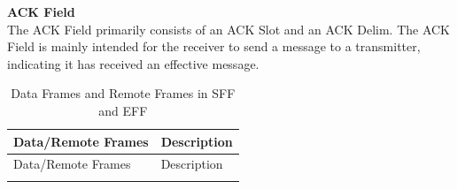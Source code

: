 \documentclass[main\_\_EN.tex]{subfiles}
\begin{document}
{\bfseries ACK Field}\\
The ACK Field primarily consists of an ACK Slot and an ACK Delim. The ACK Field is mainly intended for the receiver to send a message to a transmitter, indicating it has received an effective message.

\begin{longtable}[c]{|p{3.5cm}|p{12cm}|}

  \caption{Data Frames and Remote Frames in SFF and EFF}
  \label{table:Data Frames and Remote Frames}
  \\\hline
  \rowcolor{lightgray}
  {Data/Remote Frames} & {Description}
  \\\hline
  \endfirsthead

  \hline
  \rowcolor{lightgray}
   {Data/Remote Frames} & {Description}
   \\\hline
  \endhead
  \endfoot
  \hline
  \endlastfoot


\end{longtable}
\end{document}
